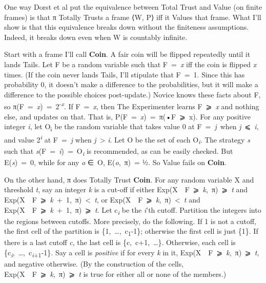 \documentclass[
  11pt,
  letterpaper,
  DIV=11,
  numbers=noendperiod,
  twoside]{scrartcl}
\begin{document}
One way Dorst et al put the equivalence between Total Trust and Value
(on finite frames) is that π Totally Trusts a frame ⟨W, P⟩ iff it Values
that frame. What I'll show is that this equivalence breaks down without
the finiteness assumptions. Indeed, it breaks down even when W is
countably infinite.

Start with a frame I'll call \textbf{Coin}. A fair coin will be flipped
repeatedly until it lands Tails. Let F be a random variable such that
F~=~\emph{x} iff the coin is flipped \emph{x} times. (If the coin never
lands Tails, I'll stipulate that F~=~1. Since this has probability 0, it
doesn't make a difference to the probabilities, but it will make a
difference to the possible choices post-update.) Novice knows these
facts about F, so π(F~=~\emph{x})~=~2\textsuperscript{-\emph{x}}. If
F~=~\emph{x}, then The Experimenter learns F~⩾~\emph{x} and nothing
else, and updates on that. That is,
P(F~=~\emph{x})~=~π(•\textbar F~⩾~x). For any positive integer \emph{i},
let O\textsubscript{i} be the random variable that takes value 0 at
F~=~\emph{j}~when \emph{j}~⩽~\emph{i}, and value
2\textsuperscript{\emph{i}} at F~=~\emph{j} when \emph{j}~\textgreater{}
\emph{i}. Let O be the set of each O\textsubscript{\emph{i}}. The
strategy \emph{s} such that
\emph{s}(F~=~\emph{i})~=~O\textsubscript{\emph{i}} is recommended, as
can be easily checked. But E(\emph{s})~=~0, while for any \emph{o} ∈~O,
E(\emph{o},~π)~= ½. So Value fails on \textbf{Coin}.

On the other hand, π does Totally Trust \textbf{Coin}. For any random
variable X and threshold \emph{t}, say an integer \emph{k} is a cut-off
if either Exp(X~\textbar~F~⩾~\emph{k},~π)~⩾~\emph{t} and
Exp(X~\textbar~F~⩾~\emph{k}~+~1,~π)~\textless~\emph{t}, or
Exp(X~\textbar~F~⩾~\emph{k},~π)~\textless~\emph{t} and
Exp(X~\textbar~F~⩾~\emph{k}~+~1,~π)~⩾~\emph{t}. Let
c\textsubscript{\emph{i}} be the \emph{i}'th cutoff. Partition the
integers into the regions between cutoffs. More precisely, do the
following. If 1 is not a cutoff, the first cell of the partition is
\{1,~\ldots,~c\textsubscript{1}-1\}; otherwise the first cell is just
\{1\}. If there is a last cutoff \emph{c}, the last cell is
\{c,~c+1,~\ldots\}. Otherwise, each cell is
\{c\textsubscript{\emph{i}},~\ldots,~c\textsubscript{\emph{i}+1}-1\}.
Say a cell is \emph{positive} if for every \emph{k} in it,
Exp(X~\textbar~F~⩾~\emph{k},~π)~⩾~\emph{t}, and negative otherwise. (By
the construction of the cells,
Exp(X~\textbar~F~⩾~\emph{k},~π)~⩾~\emph{t} is true for either all or
none of the members.)
\end{document}
